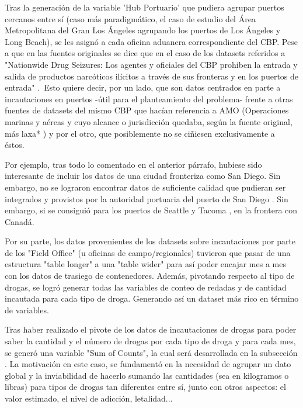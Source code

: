 \documentclass{article}
\begin{document}
		Tras la generación de la variable 'Hub Portuario' que pudiera agrupar puertos cercanos entre sí (caso más paradigmático, el caso de estudio del Área Metropolitana del Gran Los Ángeles agrupando los puertos de Los Ángeles y Long Beach), se les asignó a cada oficina aduanera correspondiente del CBP. Pese a que en las fuentes originales se dice que en el caso de los datasets referidos a "Nationwide Drug Seizures: Los agentes y oficiales del CBP prohiben la entrada y salida de productos narcóticos ilícitos a través de sus fronteras y en los puertos de entrada" \cite[CBP Nationwide]{}.\ Esto quiere decir, por un lado, que son datos centrados en parte a incautaciones en puertos -útil para el planteamiento del problema- frente a otras fuentes de datasets del mismo CBP que hacían referencia a AMO (Operaciones marinas y aéreas y cuyo alcance o jurisdicción quedaba, según la fuente original, más laxa* \cite[]{}) y por el otro, que posiblemente no se ciñiesen exclusivamente a éstos.\
		
		Por ejemplo, tras todo lo comentado en el anterior párrafo, hubiese sido interesante de incluir los datos de una ciudad fronteriza como San Diego. Sin embargo, no se lograron encontrar datos de suficiente calidad que pudieran ser integrados y provistos por la autoridad portuaria del puerto de San Diego \cite[San Diego Unified Port]{}. Sin embargo, si se consiguió para los puertos de Seattle y Tacoma \cite[]{}, en la frontera con Canadá.\
		
		Por su parte, los datos provenientes de los datasets sobre incautaciones por parte de los "Field Office" (u oficinas de campo/regionales) tuvieron que pasar de una estructura "table longer" a una "table wider" para así poder encajar mes a mes con los datos de trasiego de contenedores. Además, pivotando respecto al tipo de drogas, se logró generar todas las variables de conteo de redadas y de cantidad incautada para cada tipo de droga. Generando así un dataset más rico en término de variables.\
		
		Tras haber realizado el pivote de los datos de incautaciones de drogas para poder saber la cantidad y el número de drogas por cada tipo de droga y para cada mes, se generó una variable "Sum of Counts", la cual será desarrollada en la subsección \cite[Feature Engineering]{keylist}. La motivación en este caso, se fundamentó en la necesidad de agrupar un dato global y la inviabilidad de hacerlo sumando las cantidades (sea en kilogramos o libras) para tipos de drogas tan diferentes entre sí, junto con otros aspectos: el valor estimado, el nivel de adicción, letalidad...
		 
\end{document}

